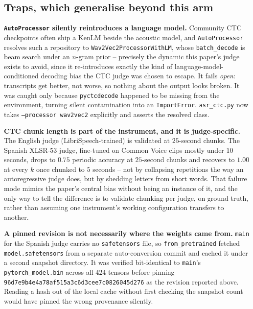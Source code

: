 \documentclass[11pt]{article}
\begin{document}
\subsection{Traps, which generalise beyond this arm}

\textbf{\texttt{AutoProcessor} silently reintroduces a language model.}
Community CTC checkpoints often ship a KenLM beside the acoustic model, and
\texttt{AutoProcessor} resolves such a repository to
\texttt{Wav2Vec2ProcessorWithLM}, whose \texttt{batch\_decode} is beam search
under an $n$-gram prior -- precisely the dynamic this paper's judge exists to
avoid, since it re-introduces exactly the kind of language-model-conditioned
decoding bias the CTC judge was chosen to escape. It fails \emph{open}:
transcripts get better, not worse, so nothing about the output looks broken.
It was caught only because \texttt{pyctcdecode} happened to be missing from
the environment, turning silent contamination into an \texttt{ImportError}.
\texttt{asr\_ctc.py} now takes \texttt{--processor wav2vec2} explicitly and
asserts the resolved class.

\textbf{CTC chunk length is part of the instrument, and it is judge-specific.}
The English judge (LibriSpeech-trained) is validated at $25$-second chunks.
The Spanish XLSR-53 judge, fine-tuned on Common Voice clips mostly under $10$
seconds, drops to $0.75$ periodic accuracy at $25$-second chunks and recovers
to $1.00$ at every $k$ once chunked to $5$ seconds -- not by collapsing
repetitions the way an autoregressive judge does, but by shedding letters from
short words. That failure mode mimics the paper's central bias without being
an instance of it, and the only way to tell the difference is to validate
chunking per judge, on ground truth, rather than assuming one instrument's
working configuration transfers to another.

\textbf{A pinned revision is not necessarily where the weights came from.}
\texttt{main} for the Spanish judge carries no \texttt{safetensors} file,
so \texttt{from\_pretrained} fetched \texttt{model.safetensors} from a
separate auto-conversion commit and cached it under a second snapshot
directory. It was verified bit-identical to \texttt{main}'s
\texttt{pytorch\_model.bin} across all $424$ tensors before pinning
\texttt{96d7e9b4e4a78af515a3c6d3cee7c0826045d276} as the revision reported
above. Reading a hash out of the local cache without first checking the
snapshot count would have pinned the wrong provenance silently.

\end{document}
